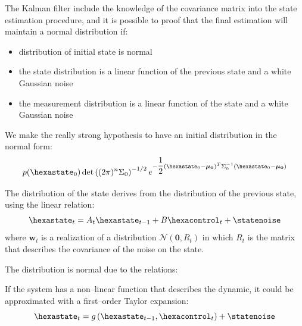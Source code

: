 The Kalman filter include the knowledge of the covariance matrix into the state estimation procedure, and it is possible to proof that the final estimation will maintain a normal distribution if:
\begin{itemize}
\item distribution of initial state is normal
\item the state distribution is a linear function of the previous state and a white Gaussian noise
\item the measurement distribution  is a linear function of the state and a white Gaussian noise
\end{itemize}

We make the really strong hypothesis to have an initial distribution in the normal form:
\begin{equation}
p(\hexastate_0) \det\braces{(2\pi)^{n}\Sigma_0}^{-1/2} e^{-\dfrac{1}{2}\braces{\hexastate_0 - \boldsymbol{\mu_0}}^T \Sigma_{0}^{-1}\braces{\hexastate_0 - \boldsymbol{\mu_0}}}
\end{equation}

The distribution of the state derives from the distribution of the previous state, using the linear relation:
\begin{equation}
\hexastate_t = A_t \hexastate_{t-1} + B \hexacontrol_t + \statenoise
\end{equation}
where ${\mathbf{w}_t}$ is a realization of a distribution ${\mathcal{N}(\mathbf{0},R_t)}$ in which $R_t$ is the matrix that describes the covariance of the noise on the state.

The distribution is normal due to the relations:

If the system has a non--linear function that describes the dynamic, it could be approximated with a first--order Taylor expansion:
\begin{equation}
\hexastate_t = g\braces{\hexastate_{t-1},\hexacontrol_t} + \statenoise
\end{equation}

